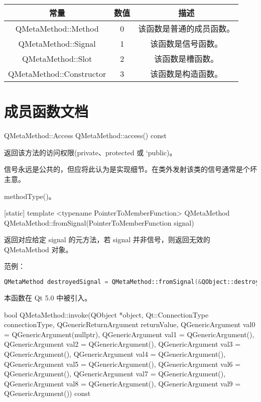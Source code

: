 \begin{tabular}{|c|c|c|}
	\hline
	常量  &	数值 	& 描述  \\ 
	\hline
	QMetaMethod::Method &	0 &	该函数是普通的成员函数。 \\
	\hline
	QMetaMethod::Signal &	1 	&该函数是信号函数。 \\
	\hline
	QMetaMethod::Slot &	2 &	该函数是槽函数。 \\ 
	\hline
	QMetaMethod::Constructor &	3 &	该函数是构造函数。 \\ 
	\hline
	\end{tabular}

\section{成员函数文档}

QMetaMethod::Access QMetaMethod::access() const

返回该方法的访问权限(private、protected 或 `public)。

\begin{notice}
信号永远是公共的，但应将此认为是实现细节。在类外发射该类的信号通常是个坏主意。
\end{notice}

\begin{notice}[另请参阅]
methodType()。
\end{notice}

[static] template <typename PointerToMemberFunction> QMetaMethod QMetaMethod::fromSignal(PointerToMemberFunction signal)

返回对应给定 signal 的元方法，若 signal 并非信号，则返回无效的 QMetaMethod 对象。

范例：

\begin{lstlisting}[language=C++]
QMetaMethod destroyedSignal = QMetaMethod::fromSignal(&QObject::destroyed);
\end{lstlisting}


本函数在 Qt 5.0 中被引入。

bool QMetaMethod::invoke(QObject *object, Qt::ConnectionType connectionType, QGenericReturnArgument returnValue, 
   QGenericArgument val0 = QGenericArgument(nullptr), 
   QGenericArgument val1 = QGenericArgument(), 
QGenericArgument val2 = QGenericArgument(), 
QGenericArgument val3 = QGenericArgument(), 
QGenericArgument val4 = QGenericArgument(), 
QGenericArgument val5 = QGenericArgument(), 
QGenericArgument val6 = QGenericArgument(), 
QGenericArgument val7 = QGenericArgument(),
 QGenericArgument val8 = QGenericArgument(), 
 QGenericArgument val9 = QGenericArgument()) const

